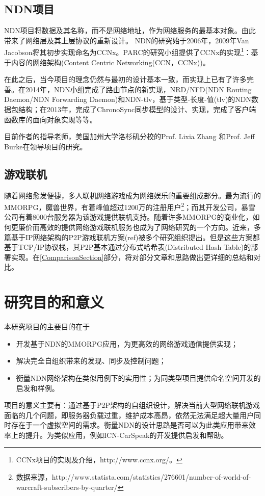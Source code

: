 \subsection*{NDN项目}
\par
NDN项目将数据及其名称，而不是网络地址，作为网络服务的最基本对象。由此带来了网络层及其上层协议的重新设计。
NDN的研究始于2006年，2009年Van Jacobson将其初步实现命名为CCNx\cite{NDNRefOriginal}。PARC的研究小组提供了CCNx的实现\footnote{CCNx项目的实现及介绍，http://www.ccnx.org/。}：基于内容的网络架构(Content Centric Networking(CCN，CCNx))。
\par
在此之后，当今项目的理念仍然与最初的设计基本一致，而实现上已有了许多完善。在2014年，NDN小组完成了路由节点的新实现，NRD/NFD(NDN Routing Daemon/NDN Forwarding Daemon)和NDN-tlv，基于类型-长度-值(tlv)的NDN数据包结构；在2013年，完成了ChronoSync同步模型的设计、实现，完成了客户端函数库的面向对象实现等等。
\par
目前作者的指导老师，美国加州大学洛杉矶分校的Prof. Lixia Zhang 和Prof. Jeff Burke在领导项目的研究。
\subsection*{游戏联机}
\par
随着网络愈发便捷，多人联机网络游戏成为网络娱乐的重要组成部分。最为流行的MMORPG，魔兽世界，有着峰值超过1200万的注册用户\footnote{数据来源，http://www.statista.com/statistics/276601/number-of-world-of-warcraft-subscribers-by-quarter/}；而其开发公司，暴雪公司有着8000台服务器为该游戏提供联机支持。随着许多MMORPG的商业化，如何更廉价而高效的提供网络游戏联机服务也成为了网络研究的一个方向。近来，多篇基于IP网络架构的P2P游戏联机方案(ref)被多个研究组织提出。但是这些方案都基于TCP/IP协议栈，其P2P基本通过分布式哈希表(Distributed Hash Table)的部署实现。在\ref{ComparisonSection}部分，将对部分文章和思路做出更详细的总结和对比。
\section{研究目的和意义}
\par
本研究项目的主要目的在于
\begin{itemize}
\item
开发基于NDN的MMORPG应用，为更高效的网络游戏通信提供实现；
\item
解决完全自组织带来的发现、同步及控制问题；
\item
衡量NDN网络架构在类似用例下的实用性；为同类型项目提供命名空间开发的启发和样例。
\end{itemize}
\par
项目的意义主要有：通过基于P2P架构的自组织设计，解决当前大型网络联机游戏面临的几个问题，即服务器负载过重，维护成本高昂，依然无法满足超大量用户同时存在于一个虚拟空间的需求。衡量NDN的设计思路是否可以为此类应用带来效率上的提升。为类似应用，例如ICN-CarSpeak\cite{V2VUseCaseRef}的开发提供启发和帮助。
